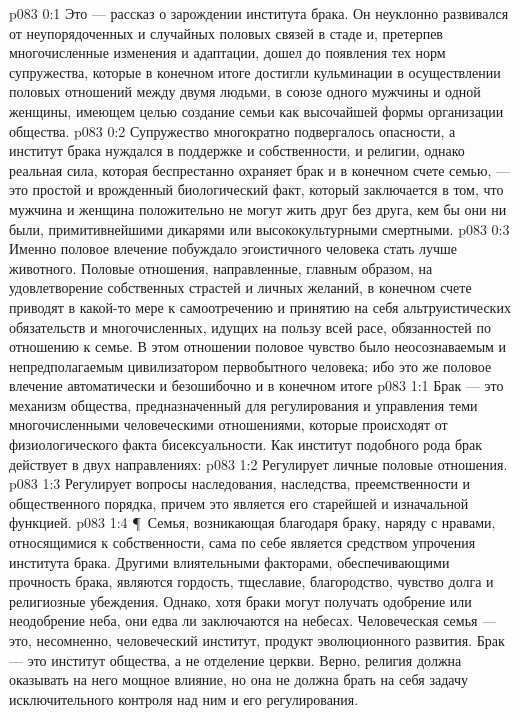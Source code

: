 \vs p083 0:1 Это --- рассказ о зарождении института брака. Он неуклонно развивался от неупорядоченных и случайных половых связей в стаде и, претерпев многочисленные изменения и адаптации, дошел до появления тех норм супружества, которые в конечном итоге достигли кульминации в осуществлении половых отношений между двумя людьми, в союзе одного мужчины и одной женщины, имеющем целью создание семьи как высочайшей формы организации общества.
\vs p083 0:2 Супружество многократно подвергалось опасности, а институт брака нуждался в поддержке и собственности, и религии, однако реальная сила, которая беспрестанно охраняет брак и в конечном счете семью, --- это простой и врожденный биологический факт, который заключается в том, что мужчина и женщина положительно не могут жить друг без друга, кем бы они ни были, примитивнейшими дикарями или высококультурными смертными.
\vs p083 0:3 Именно половое влечение побуждало эгоистичного человека стать лучше животного. Половые отношения, направленные, главным образом, на удовлетворение собственных страстей и личных желаний, в конечном счете приводят в какой\hyp{}то мере к самоотречению и принятию на себя альтруистических обязательств и многочисленных, идущих на пользу всей расе, обязанностей по отношению к семье. В этом отношении половое чувство было неосознаваемым и непредполагаемым цивилизатором первобытного человека; ибо это же половое влечение автоматически и безошибочно  и в конечном итоге 
\vs p083 1:1 Брак --- это механизм общества, предназначенный для регулирования и управления теми многочисленными человеческими отношениями, которые происходят от физиологического факта бисексуальности. Как институт подобного рода брак действует в двух направлениях:
\vs p083 1:2 \bibnobreakspace Регулирует личные половые отношения.
\vs p083 1:3 \bibnobreakspace Регулирует вопросы наследования, наследства, преемственности и общественного порядка, причем это является его старейшей и изначальной функцией.
\vs p083 1:4 \P\ Семья, возникающая благодаря браку, наряду с нравами, относящимися к собственности, сама по себе является средством упрочения института брака. Другими влиятельными факторами, обеспечивающими прочность брака, являются гордость, тщеславие, благородство, чувство долга и религиозные убеждения. Однако, хотя браки могут получать одобрение или неодобрение неба, они едва ли заключаются на небесах. Человеческая семья --- это, несомненно, человеческий институт, продукт эволюционного развития. Брак --- это институт общества, а не отделение церкви. Верно, религия должна оказывать на него мощное влияние, но она не должна брать на себя задачу исключительного контроля над ним и его регулирования.
